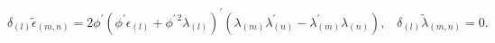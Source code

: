 \begin{equation*}
\delta _{(l)}\tilde{\epsilon}_{(m,n)}=2\phi ^{\prime }\left( \phi ^{\prime
}\epsilon _{(l)}+\phi ^{\prime \,2}\lambda _{(l)}\right) ^{\prime }(\lambda
_{(m)}\lambda _{(n)}^{\prime }-\lambda _{(m)}^{\prime }\lambda
_{(n)}),\;\;\;\delta _{(l)}\tilde{\lambda}_{(m,n)}=0.
\end{equation*}

